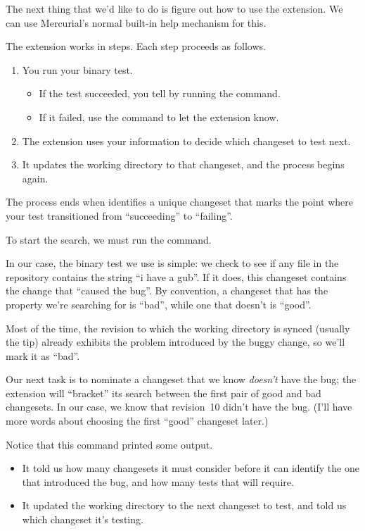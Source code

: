 The next thing that we'd like to do is figure out how to use the
 extension.  We can use Mercurial's normal built-in help
mechanism for this.

The  extension works in steps.  Each step proceeds as follows.
\begin{enumerate}
\item You run your binary test.
  \begin{itemize}
  \item If the test succeeded, you tell  by running the
     command.
  \item If it failed, use the  command to let
    the  extension know.
  \end{itemize}
\item The extension uses your information to decide which changeset to
  test next.
\item It updates the working directory to that changeset, and the
  process begins again.
\end{enumerate}
The process ends when  identifies a unique changeset
that marks the point where your test transitioned from ``succeeding''
to ``failing''.

To start the search, we must run the  command.

In our case, the binary test we use is simple: we check to see if any
file in the repository contains the string ``i have a gub''.  If it
does, this changeset contains the change that ``caused the bug''.  By
convention, a changeset that has the property we're searching for is
``bad'', while one that doesn't is ``good''.

Most of the time, the revision to which the working directory is
synced (usually the tip) already exhibits the problem introduced by
the buggy change, so we'll mark it as ``bad''.

Our next task is to nominate a changeset that we know \emph{doesn't}
have the bug; the  extension will ``bracket'' its search
between the first pair of good and bad changesets.  In our case, we
know that revision~10 didn't have the bug.  (I'll have more words
about choosing the first ``good'' changeset later.)

Notice that this command printed some output.
\begin{itemize}
\item It told us how many changesets it must consider before it can
  identify the one that introduced the bug, and how many tests that
  will require.
\item It updated the working directory to the next changeset to test,
  and told us which changeset it's testing.
\end{itemize}

